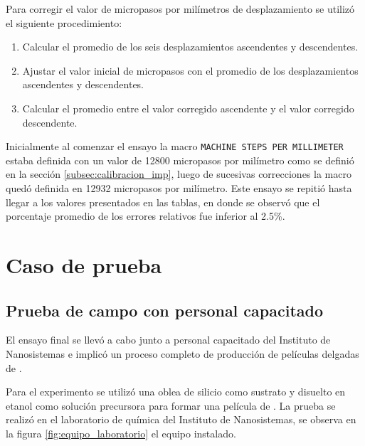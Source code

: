 Para corregir el valor de micropasos por milímetros de desplazamiento se utilizó el siguiente procedimiento:
\begin{enumerate}
\item Calcular el promedio de los seis desplazamientos ascendentes y descendentes.
\item Ajustar el valor inicial de micropasos con el promedio de los desplazamientos ascendentes y descendentes. 
\item Calcular el promedio entre el valor corregido ascendente y el valor corregido descendente.
\end{enumerate}


Inicialmente al comenzar el ensayo la macro \texttt{MACHINE STEPS PER MILLIMETER}  estaba definida con un valor de 12800 micropasos por milímetro como se definió en la sección \ref{subsec:calibracion_imp}, luego de sucesivas correcciones la macro quedó definida en 12932 micropasos por milímetro.
Este ensayo se repitió hasta llegar a los valores presentados en las tablas, en donde se observó que el porcentaje promedio de los errores relativos fue inferior al 2.5\%.

\section{Caso de prueba}
\subsection{Prueba de campo con personal capacitado}

El ensayo final se llevó a cabo junto a personal capacitado del Instituto de Nanosistemas e implicó un proceso completo de producción de películas delgadas de .

Para el experimento se utilizó  una oblea de silicio como sustrato y  disuelto en etanol como solución precursora para formar una película de . La prueba se realizó en el laboratorio de química del Instituto de Nanosistemas, se observa en la figura \ref{fig:equipo_laboratorio} el equipo instalado.


